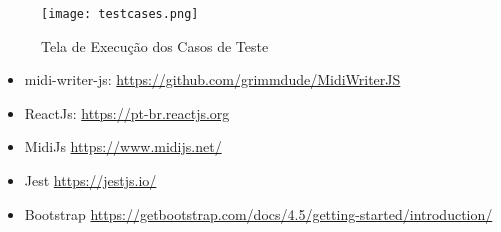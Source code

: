 \documentclass[12pt]{article}
\begin{document}
\begin{figure}[htp]
    \centering
    \texttt{[image: testcases.png]}
    \caption{Tela de Execução dos Casos de Teste}
    \label{fig:interfacef3}
\end{figure}

\newpage



\begin{itemize}
\item {midi-writer-js: \url{https://github.com/grimmdude/MidiWriterJS}}
\item {ReactJs: \url{https://pt-br.reactjs.org}}
\item MidiJs \url{https://www.midijs.net/}
\item Jest \url{https://jestjs.io/}
\item Bootstrap \url{https://getbootstrap.com/docs/4.5/getting-started/introduction/}

\end{itemize}
\end{document}
